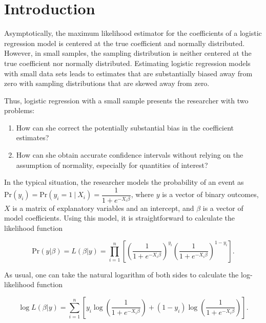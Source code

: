 \documentclass[12pt]{article}
\begin{document}

\section*{Introduction}

Asymptotically, the maximum likelihood estimator for the coefficients of a logistic regression model is centered at the true coefficient and normally distributed. However, in small samples, the sampling distribution is neither centered at the true coefficient nor normally distributed. Estimating logistic regression models with small data sets leads to estimates that are substantially biased away from zero with sampling distributions that are skewed away from zero. 

Thus, logistic regression with a small sample presents the researcher with two problems: 
\begin{enumerate}
\item How can she correct the potentially substantial bias in the coefficient estimates? 
\item How can she obtain accurate confidence intervals without relying on the assumption of normality, especially for quantities of interest?
\end{enumerate}
	
In the typical situation, the researcher models the probability of an event as $\text{Pr}(y_i) = \text{Pr}(y_i = 1~|~ X_i) = \dfrac{1}{1 + e^{-X_i\beta}}$, where $y$ is a vector of binary outcomes, $X$ is a matrix of explanatory variables and an intercept, and $\beta$ is a vector of model coefficients. Using this model, it is straightforward to calculate the likelihood function 

\begin{equation}\nonumber
\text{Pr}(y | \beta) = L(\beta | y) = \displaystyle \prod_{i = 1}^n \left[\left( \dfrac{1}{1 + e^{-X_i\beta}}\right)^{y_i}\left( \dfrac{1}{1 + e^{-X_i\beta}}\right)^{1 - y_i}\right]\text{.}
\end{equation}

\noindent As usual, one can take the natural logarithm of both sides to calculate the log-likelihood function 

\begin{equation}\nonumber
\log L(\beta | y) = \displaystyle \sum_{i = 1}^n \left[y_i \log \left( \dfrac{1}{1 + e^{-X_i\beta}}\right) + (1 - y_i) \log \left( \dfrac{1}{1 + e^{-X_i\beta}}\right)\right].
\end{equation}
\end{document}
